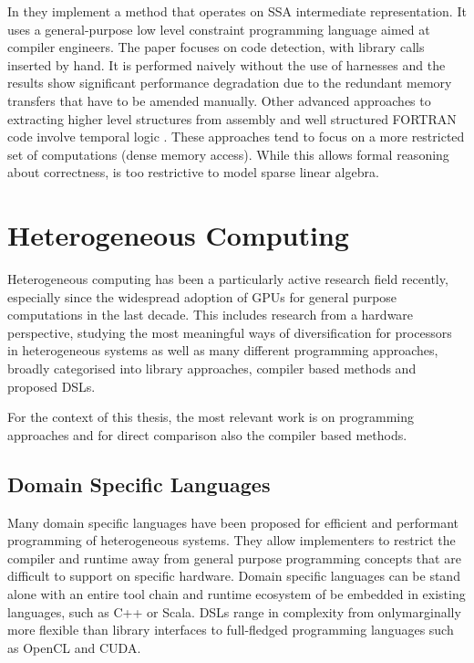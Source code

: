     In \cite{Ginsbach:2018:AML:3173162.3173182} they implement a method that
    operates on SSA intermediate representation.
    It uses a  general-purpose low level constraint programming language  aimed at
    compiler engineers. %
    The %
    paper focuses  on code detection, with library calls inserted by hand.
    It is performed naively without the use of harnesses and the results show
    significant performance degradation due to the redundant memory transfers that
    have to be amended manually.
    Other advanced approaches to extracting higher
    level structures from assembly and well structured FORTRAN code
    involve temporal logic \cite{Mendis2015Helium, Kamil2016Verified}.
    These approaches tend to focus on a more restricted set of
    computations (dense memory access).
    While this allows formal reasoning about correctness, is too restrictive to
    model sparse linear algebra.

\section{Heterogeneous Computing}

    Heterogeneous computing has been a particularly active research field
    recently, especially since the widespread adoption of GPUs for general
    purpose computations in the last decade.
    This includes research from a hardware perspective, studying
    the most meaningful ways of diversification for processors in heterogeneous
    systems as well as many different programming approaches, broadly
    categorised into library approaches, compiler based methods and proposed
    DSLs.

    For the context of this thesis, the most relevant work is on programming
    approaches and for direct comparison also the compiler based methods.

\subsection{Domain Specific Languages}

    Many domain specific languages have been proposed for efficient and
    performant programming of heterogeneous systems.
    They allow implementers to restrict the compiler and runtime away from
    general purpose programming concepts that are difficult to support on
    specific hardware.
    Domain specific languages can be stand alone with an entire tool chain and
    runtime ecosystem of be embedded in existing languages, such as C++ or
    Scala.
    DSLs range in complexity from onlymarginally more flexible than library
    interfaces to full-fledged programming languages such as OpenCL and CUDA.


